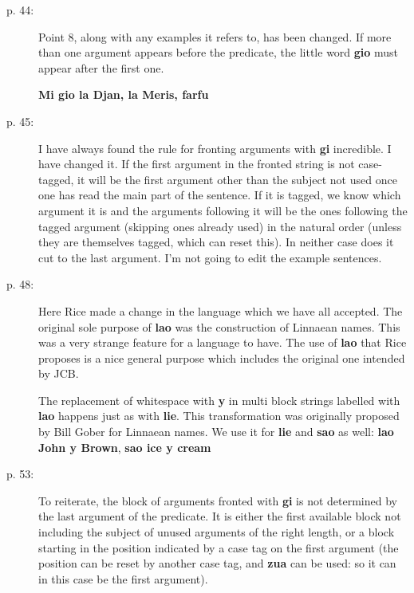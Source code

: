 \documentclass[12pt]{article}
\begin{document}
\begin{description}

\item[p. 44:]  Point 8, along with any examples it refers to, has been changed.  If more than one argument appears before the predicate, the little word {\bf gio} must appear after the first one.

{\bf Mi gio la Djan, la Meris, farfu}

\item[p. 45:]  I have always found the rule for fronting arguments with {\bf gi} incredible.  I have changed it.
If the first argument in the fronted string is not case-tagged, it will be the first argument other than the subject not used once one has read the main part of the sentence.  If it is tagged, we know which argument it is and the arguments following it will be the ones following the tagged argument (skipping ones already used) in the natural order (unless they are themselves tagged, which can reset this).  In neither case does it cut to the last argument.  I'm not going to edit the example sentences.

\item[p. 48:]  Here Rice made a change in the language which we have all accepted.  The original sole purpose of
{\bf lao} was the construction of Linnaean names.  This was a very strange feature for a language to have.  The use of {\bf lao} that Rice proposes is a nice general purpose which includes the original one intended by JCB.

The replacement of whitespace with {\bf y} in multi block strings labelled with {\bf lao} happens just as with {\bf lie}.
This transformation was originally proposed by Bill Gober for Linnaean names.  We use it for {\bf lie} and {\bf sao} as well:  {\bf lao John y Brown}, {\bf sao ice y cream}

\item[p. 53:]  To reiterate, the block of arguments fronted with {\bf gi} is not determined by the last argument of the predicate.  It is either the first available block not including the subject of unused arguments of the right length, or a block starting in the position indicated by a case tag on the first argument (the position can be reset by another case tag, and {\bf zua} can be used:  so it can in this case be the first argument).

\end{description}
\end{document}

